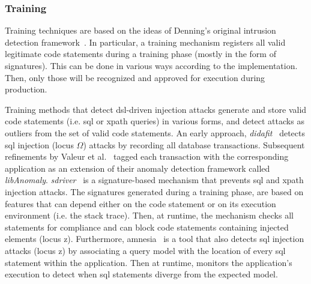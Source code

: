 \documentclass[conference]{IEEEtran}
\begin{document}

\subsubsection{Training}

Training techniques are based on the ideas of Denning's original
intrusion detection framework~\cite{Den87}. In particular, a training
mechanism registers all valid legitimate code statements during a
training phase (mostly in the form of signatures). This can
be done in various ways according to the implementation. Then, only
those will be recognized and approved for execution
during production.

Training methods that detect {\sc dsl}-driven injection attacks
generate and store valid code statements (i.e. {\sc sql}
or {\sc xp}ath queries) in various forms, and detect attacks
as outliers from the set of valid code statements.
An early approach, {\it {\sc didafit}}~\cite{LLW02} detects
{\sc sql} injection (locus $\Omega$) attacks by recording all database transactions.
Subsequent refinements by Valeur et al.~\cite{VMV05}
tagged each transaction with the corresponding application
as an extension of their anomaly detection framework called
{\it libAnomaly}. {\it {\sc sd}river}~\cite{MS09,MKS09,MKLS11} is
a signature-based mechanism that prevents {\sc sql} and
{\sc xp}ath injection attacks. The signatures generated
during a training phase, are based on features that can
depend either on the code statement or on its execution
environment (i.e. the stack trace).
Then, at runtime, the mechanism checks all statements for compliance
and can block code statements containing injected elements (locus {\sc z}).
Furthermore, {\sc amnesia}~\cite{HO05,HO06,HO05b} is a tool
that also detects {\sc sql} injection attacks (locus {\sc z})
by associating a query model with the location of every
{\sc sql} statement within the application.
Then at runtime, monitors the application's execution to
detect when {\sc sql} statements diverge from the expected model.
\end{document}
